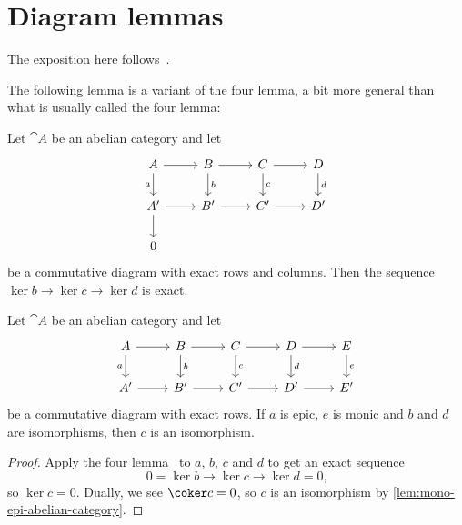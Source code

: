 \section{Diagram lemmas}
\noindent
The exposition here follows~\cite{IversenCohomologyOfSheaves}.

The following lemma is a variant of the four lemma, a bit more general than what is usually called the four lemma:
\begin{lem}\label{lem:four-lemma}
Let \(\cat A\) be an abelian category and let
\begin{equation*}
  \begin{tikzcd}
    A \ar[r] \ar[d, "a"'] & B \ar[r] \ar[d, "b"] & C \ar[r] \ar[d, "c"] & D \ar[d, "d"] \\
    A' \ar[r] \ar[d] & B' \ar[r] & C' \ar[r] & D' \\
    0
  \end{tikzcd}
\end{equation*}
be a commutative diagram with exact rows and columns.
Then the sequence \(\ker b\to\ker c\to\ker d\) is exact.
\end{lem}

\begin{cor}\label{lem:five-lemma}
Let \(\cat A\) be an abelian category and let
\begin{equation*}
  \begin{tikzcd}
    A \ar[r] \ar[d, "a"'] & B \ar[r] \ar[d, "b"] & C \ar[r] \ar[d, "c"] & D \ar[r] \ar[d, "d"] & E \ar[d, "e"] \\
    A' \ar[r] & B' \ar[r] & C' \ar[r] & D' \ar[r] & E'
  \end{tikzcd}
\end{equation*}
be a commutative diagram with exact rows.
If \(a\) is epic, \(e\) is monic and \(b\) and \(d\) are isomorphisms, then \(c\) is an isomorphism.
\end{cor}
\begin{proof}
Apply the four lemma~ to \(a\), \(b\), \(c\) and \(d\) to get an exact sequence
\[0=\ker b\to\ker c\to\ker d=0\text{,} \] so \(\ker c=0\).
Dually, we see \(\coker c=0\), so \(c\) is an isomorphism by \cref{lem:mono-epi-abelian-category}.
\end{proof}

